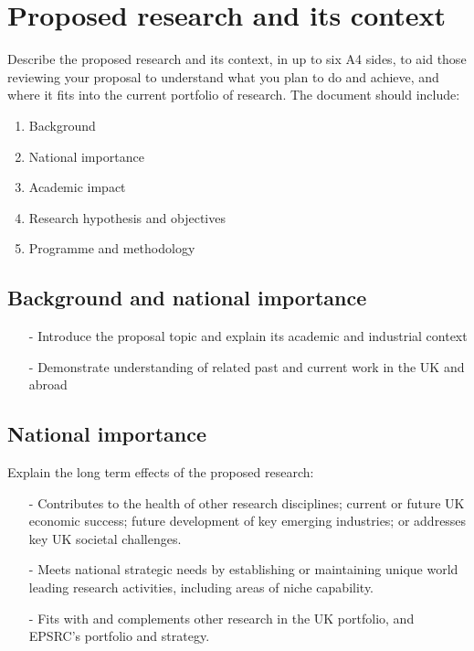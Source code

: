 \documentclass{epsrc}
\begin{document}
 

\section{Proposed research and its context}

Describe the proposed research and its context, in up to six A4 sides, to aid those reviewing your proposal to understand what you plan to do and achieve, and where it fits into the current portfolio of research. The document should include:


\begin{enumerate}[label=\roman*.]
	\item Background
	\item National importance
	\item Academic impact
	\item Research hypothesis and objectives
	\item Programme and methodology
\end{enumerate}

\subsection{Background and national importance}
\begin{itemize}
	\item[-] Introduce the proposal topic and explain its academic and industrial context
	\item[-] Demonstrate understanding of related past and current work in the UK and abroad
\end{itemize}


\subsection{National importance}
Explain the long term effects of the proposed research:

\begin{itemize}
	\item[-] Contributes to the health of other research disciplines; current or future UK economic success; future development of key emerging industries; or addresses key UK societal challenges.
	\item[-] Meets national strategic needs by establishing or maintaining unique world leading research activities, including areas of niche capability.
	\item[-] Fits with and complements other research in the UK portfolio, and EPSRC's portfolio and strategy.
\end{itemize}
\end{document}
